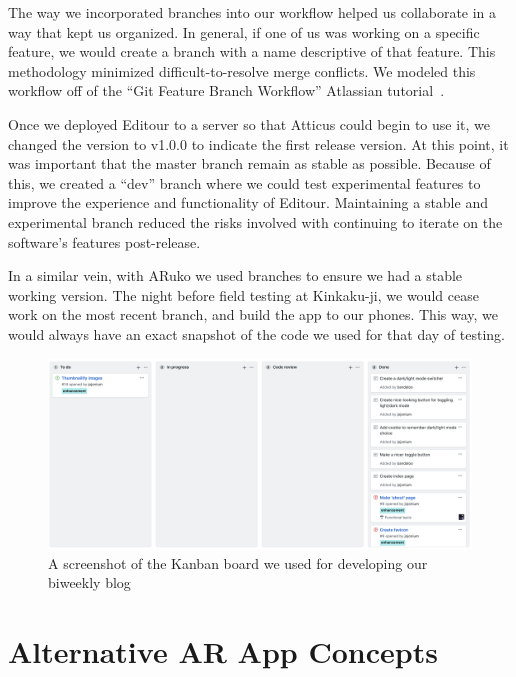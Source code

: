 \documentclass[a4paper, 10pt, american, titlepage]{article}
\begin{document}
The way we incorporated branches into our workflow helped us collaborate in a
way that kept us organized. In general, if one of us was working on a specific
feature, we would create a branch with a name descriptive of that feature. This
methodology minimized difficult-to-resolve merge conflicts. We modeled this
workflow off of the ``Git Feature Branch Workflow'' Atlassian
tutorial~\autocite{atlassian}.

Once we deployed Editour to a server so that Atticus could begin to use it,
we changed the version to v1.0.0 to indicate the first release version. At this
point, it was important that the master branch remain as stable as possible.
Because of this, we created a ``dev'' branch where we could test experimental
features to improve the experience and functionality of Editour. Maintaining a
stable and experimental branch reduced the risks involved with continuing to
iterate on the software's features post-release.

In a similar vein, with ARuko we used branches to ensure we had a stable working
version. The night before field testing at Kinkaku-ji, we would cease work on
the most recent branch, and build the app to our phones. This way, we would
always have an exact snapshot of the code we used for that day of testing.

\begin{figure}[h]
	\centering
	\includegraphics[width=\textwidth]{kanban-board.png}
	\caption{A screenshot of the Kanban board we used for developing our
    biweekly blog}
	\label{fig:kanbanBoard}
\end{figure}

\clearpage

\section{Alternative AR App Concepts}
\label{sec:alternativeArAppConcepts}
\end{document}
